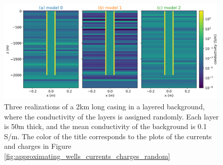 \begin{figure}
    \begin{center}
    \includegraphics[width=\textwidth]{figures/dc_casing/random_layers.png}
    \end{center}
\caption{
    Three realizations of a 2km long casing in a layered background, where the conductivity of the
    layers is assigned randomly. Each layer is 50m thick, and the mean conductivity of the background
    is 0.1 S/m. The color of the title corresponds to the plots of the currents and charges in Figure
    \ref{fig:approximating_wells_currents_charges_random}
}
\label{fig:random_layers}
\end{figure}

